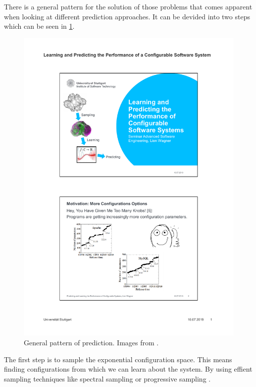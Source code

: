 \noindent
There is a general pattern for the solution of those problems that comes apparent when looking at different prediction approaches. It can be devided into two steps which can be seen in \cref{fig:GeneralApproach}.\begin{figure}
	\includegraphics[page=9,clip,trim=4.1cm 5.9cm 3.9cm 19.4cm, width=\textwidth]{presentation/presentation}
	\caption{General pattern of prediction. Images from \cite{VAMOSConference}.}	\label{fig:GeneralApproach}
\end{figure}

The first step is to sample the exponential configuration space. This means finding configurations from which we can learn about the system. By using effient sampling techniques like spectral sampling \cite{DistanceBasedSampling2019} or progressive sampling \cite{CostEfficientSampling_Gou_Siegmund_2015}.


